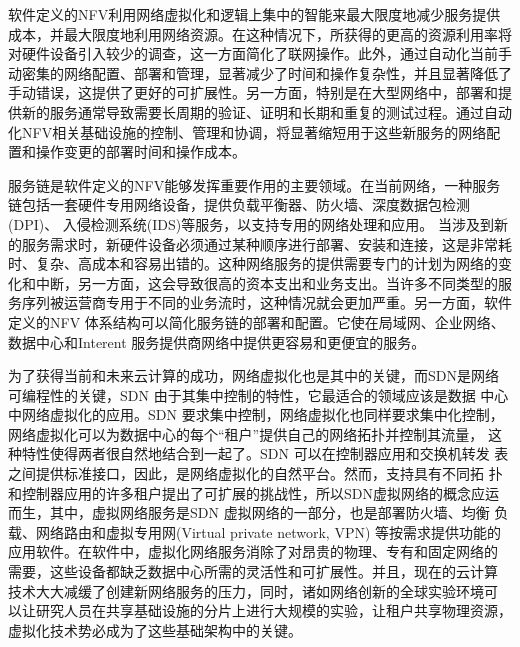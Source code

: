 软件定义的NFV利用网络虚拟化和逻辑上集中的智能来最大限度地减少服务提供成本，并最大限度地利用网络资源。在这种情况下，所获得的更高的资源利用率将对硬件设备引入较少的调查，这一方面简化了联网操作。此外，通过自动化当前手动密集的网络配置、部署和管理，显著减少了时间和操作复杂性，并且显著降低了手动错误，这提供了更好的可扩展性。另一方面，特别是在大型网络中，部署和提供新的服务通常导致需要长周期的验证、证明和长期和重复的测试过程。通过自动化NFV相关基础设施的控制、管理和协调，将显著缩短用于这些新服务的网络配置和操作变更的部署时间和操作成本。

服务链是软件定义的NFV能够发挥重要作用的主要领域\cite{friis2009service,lemmens2007enhancing}。在当前网络，一种服务链包括一套硬件专用网络设备，提供负载平衡器、防火墙、深度数据包检测(DPI)、 入侵检测系统(IDS)等服务，以支持专用的网络处理和应用\cite{greenberg2005clean,tschudin2001selnet,joseph2008policy,santos2008bridging}。 当涉及到新的服务需求时，新硬件设备必须通过某种顺序进行部署、安装和连接，这是非常耗时、复杂、高成本和容易出错的。这种网络服务的提供需要专门的计划为网络的变化和中断，另一方面，这会导致很高的资本支出和业务支出。当许多不同类型的服务序列被运营商专用于不同的业务流时，这种情况就会更加严重。另一方面，软件定义的NFV 体系结构可以简化服务链的部署和配置。它使在局域网、企业网络、数据中心和Interent 服务提供商网络中提供更容易和更便宜的服务。




为了获得当前和未来云计算的成功，网络虚拟化也是其中的关键，而SDN是网络可编程性的关键，SDN 由于其集中控制的特性，它最适合的领域应该是数据 中心中网络虚拟化的应用。SDN 要求集中控制，网络虚拟化也同样要求集中化控制，网络虚拟化可以为数据中心的每个“租户”提供自己的网络拓扑并控制其流量， 这种特性使得两者很自然地结合到一起了。SDN 可以在控制器应用和交换机转发 表之间提供标准接口，因此，是网络虚拟化的自然平台。然而，支持具有不同拓 扑和控制器应用的许多租户提出了可扩展的挑战性，所以SDN虚拟网络的概念应运而生，其中，虚拟网络服务是SDN 虚拟网络的一部分，也是部署防火墙、均衡 负载、网络路由和虚拟专用网(Virtual private network, VPN) 等按需求提供功能的 应用软件。在软件中，虚拟化网络服务消除了对昂贵的物理、专有和固定网络的 需要，这些设备都缺乏数据中心所需的灵活性和可扩展性。并且，现在的云计算 技术大大减缓了创建新网络服务的压力，同时，诸如网络创新的全球实验环境可 以让研究人员在共享基础设施的分片上进行大规模的实验，让租户共享物理资源， 虚拟化技术势必成为了这些基础架构中的关键。



